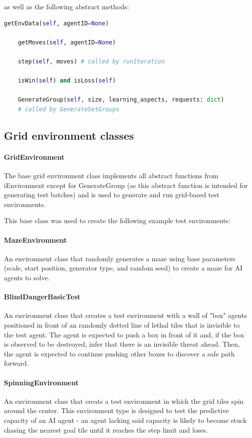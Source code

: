 \documentclass[masterthesis]{fer}
\begin{document}
as well as the following abstract methods:
\begin{lstlisting}[language=Python]
    getEnvData(self, agentID=None)

    getMoves(self, agentID=None)

    step(self, moves) # called by runIteration

    isWin(self) and isLoss(self)

    GenerateGroup(self, size, learning_aspects, requests: dict)
    # called by GenerateSetGroups
\end{lstlisting}

\subsection{Grid environment classes}
\paragraph{GridEnvironment}
The base grid environment class implements all abstract functions from iEnvironment except for GenerateGroup (as this abstract function is intended for generating test batches)
and is used to generate and run grid-based test environments.

This base class was used to create the following example test environments:
\paragraph{MazeEnvironment} An environment class that randomly generates a maze using base parameters (scale, start position, generator type, and random seed) to create a maze for AI agents to solve.
\paragraph{BlindDangerBasicTest} An environment class that creates a test environment with a wall of "box" agents positioned in front of an randomly dotted line of lethal tiles that is invisible to the test agent. The agent is expected to push a box in front of it and, if the box is observed to be destroyed, infer that there is an invisible threat ahead. Then, the agent is expected to continue pushing other boxes to discover a safe path forward.
\paragraph{SpinningEnvironment} An environment class that creats a test environment in which the grid tiles spin around the center. This environment type is designed to test the predictive capacity of an AI agent - an agent lacking said capacity is likely to become stuck chasing the nearest goal tile until it reaches the step limit and loses.
\end{document}
